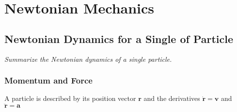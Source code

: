 \documentclass[11pt, a4paper]{article}
\newcommand{\bdot}[1]{\dot{\bm{#1}}}
\newcommand{\bddot}[1]{\ddot{\bm{#1}}}
\begin{document}
\tableofcontents

\newpage

\section{Newtonian Mechanics}

\subsection{Newtonian Dynamics for a Single of Particle}
\textit{Summarize the Newtonian dynamics of a single particle.}

\subsubsection{Momentum and Force}
A particle is described by its position vector $ \bm{r} $ and the derivatives $ \bdot{r} = \bm{v}$ and $ \bddot{r} = \bm{a}$
\end{document}
